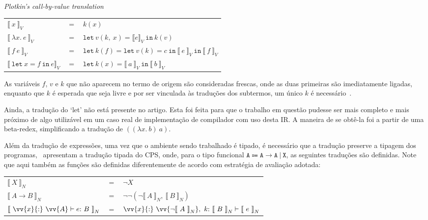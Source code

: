 \phantom{Newline}

 \textit{Plotkin's call-by-value translation}

\begin{tabular}{lcl}
  ${\llbracket\ x\ \rrbracket}_V$ & $=$ & $k(x)$ \\
  ${\llbracket\ \lambda x.\ e\ \rrbracket}_V$ & $=$ & $\mathtt{let}\ v(k,\ x) = {\llbracket e \rrbracket}_V\ \mathtt{in}\ k(v)$ \\
  ${\llbracket\ f\ e\ \rrbracket}_V$ & $=$ & $\mathtt{let}\ k(f) = \mathtt{let}\ v(k) = c\ \mathtt{in}\ {\llbracket\ e\ \rrbracket}_V\ \mathtt{in}\ {\llbracket\ f\ \rrbracket}_V$ \\
  ${\llbracket\ \mathtt{let}\ x = f\ \mathtt{in}\ e \rrbracket}_V$ & $=$ & $\mathtt{let}\ k(x) = {\llbracket\ a\ \rrbracket}_V\ \mathtt{in}\ {\llbracket\ b\ \rrbracket}_V$
\end{tabular}

\phantom{Newline}

\noindent As variáveis $f$, $v$ e $k$ que não aparecem no termo de origem são consideradas frescas, onde as duas primeiras são imediatamente ligadas, enquanto que $k$ é esperada que seja livre e por ser vinculada às traduções dos subtermos, um único $k$ é necessário~\cite{torrens2024operational}.

Ainda, a tradução do `let' não está presente no artigo.
Esta foi feita para que o trabalho em questão pudesse ser mais completo e mais próximo de algo utilizável em um caso real de implementação de compilador com uso desta IR.
A maneira de se obtê-la foi a partir de uma beta-redex, simplificando a tradução de $((\lambda x.\ b)\ a)$.

Além da tradução de expressões, uma vez que o ambiente sendo trabalhado é tipado, é necessário que a tradução preserve a tipagem dos programas,~ apresentam a tradução tipada do CPS, onde, para o tipo funcional $\mathtt{A \Coloneqq A \to A\ |\ X}$, as seguintes traduções são definidas.
Note que aqui também as funções são definidas diferentemente de acordo com estratégia de avaliação adotada:

\phantom{Newline}

\begin{tabular}{lcl}
     ${\llbracket\ X\ \rrbracket}_N$ & $=$ & $\neg X$ \\ 
     ${\llbracket\ A \rightarrow B\ \rrbracket}_N$ & $=$ & $\neg\neg(\neg{\llbracket\ A\ \rrbracket}_N,\ {\llbracket\ B\ \rrbracket}_N)$ \\ 
     ${\llbracket\ \vv{x}{:}\ \vv{A} \vdash e{:}\ B\ \rrbracket}_N$ & $=$ & $\vv{x}{:}\ \vv{\neg{\llbracket\ A\ \rrbracket}_N},\ k{:}\ {\llbracket\ B\ \rrbracket}_N \vdash {\llbracket\ e\ \rrbracket}_N$ \\ 
\end{tabular}

